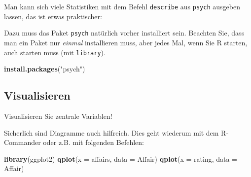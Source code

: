 \documentclass[12pt,ngerman,]{book}
\makeatletter
\newenvironment{Shaded}{\begin{snugshade}}{\end{snugshade}}
\newcommand{\KeywordTok}[1]{\textcolor[rgb]{0.13,0.29,0.53}{\textbf{{#1}}}}
\newcommand{\DataTypeTok}[1]{\textcolor[rgb]{0.13,0.29,0.53}{{#1}}}
\newcommand{\StringTok}[1]{\textcolor[rgb]{0.31,0.60,0.02}{{#1}}}
\newcommand{\CommentTok}[1]{\textcolor[rgb]{0.56,0.35,0.01}{\textit{{#1}}}}
\newcommand{\NormalTok}[1]{{#1}}
\newenvironment{kframe}{%
\medskip{}
\setlength{\fboxsep}{.8em}
 \def\at@end@of@kframe{}%
 \ifinner\ifhmode%
  \def\at@end@of@kframe{\end{minipage}}%
  \begin{minipage}{\columnwidth}%
 \fi\fi%
 \def\FrameCommand##1{\hskip\@totalleftmargin \hskip-\fboxsep
 \colorbox{shadecolor}{##1}\hskip-\fboxsep
     \hskip-\linewidth \hskip-\@totalleftmargin \hskip\columnwidth}%
 \MakeFramed {\advance\hsize-\width
   \@totalleftmargin\z@ \linewidth\hsize
   \@setminipage}}%
 {\par\unskip\endMakeFramed%
 \at@end@of@kframe}
\renewenvironment{Shaded}{\begin{kframe}}{\end{kframe}}
\makeatother
\begin{document}
Man kann sich viele Statistiken mit dem Befehl \texttt{describe} aus
\texttt{psych} ausgeben lassen, das ist etwas praktischer:

\begin{Shaded}
\end{Shaded}

Dazu muss das Paket \texttt{psych} natürlich vorher installiert sein.
Beachten Sie, dass man ein Paket nur \emph{einmal} installieren muss,
aber jedes Mal, wenn Sie R starten, auch starten muss (mit
\texttt{library}).

\begin{Shaded}
\begin{Highlighting}[]
\KeywordTok{install.packages}\NormalTok{(}\StringTok{"psych"}\NormalTok{)}
\end{Highlighting}
\end{Shaded}

\subsection{Visualisieren}\label{visualisieren}

Visualisieren Sie zentrale Variablen!

Sicherlich sind Diagramme auch hilfreich. Dies geht wiederum mit dem
R-Commander oder z.B. mit folgenden Befehlen:

\begin{Shaded}
\begin{Highlighting}[]

\KeywordTok{library}\NormalTok{(ggplot2)}
\KeywordTok{qplot}\NormalTok{(}\DataTypeTok{x =} \NormalTok{affairs, }\DataTypeTok{data =} \NormalTok{Affair)}
\KeywordTok{qplot}\NormalTok{(}\DataTypeTok{x =} \NormalTok{rating, }\DataTypeTok{data =} \NormalTok{Affair)}
\end{Highlighting}
\end{Shaded}
\end{document}
